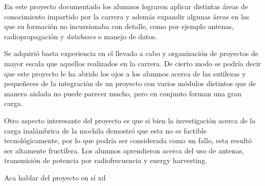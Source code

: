 
En este proyecto documentado los alumnos lograron aplicar distintas áreas de conocimiento impartido por la carrera y además expandir algunas áreas en las que su formación no incursionaba con detalle, como por ejemplo antenas, radiopropagación y \textit{databases} o manejo de datos.

Se adquirió basta experiencia en el llevado a cabo y organización de proyectos de mayor escala que aquellos realizados en la carrera. De cierto modo se podría decir que este proyecto le ha abrido los ojos a los alumnos acerca de las sutilezas y pequeñeces de la integración de un proyecto con varios módulos distintos que de manera aislada no puede parecer mucho, pero en conjunto forman una gran carga.

Otro aspecto interesante del proyecto es que si bien la investigación acerca de la carga inalámbrica de la mochila demostró que esta no es factible tecnológicamente, por lo que podría ser considerada como un fallo, esta resultó ser altamente fructífera. Los alumnos aprendieron acerca del uso de antenas, transmisión de potencia por radiofrecuencia y energy harvesting.

Aca hablar del proyecto en sí xd


